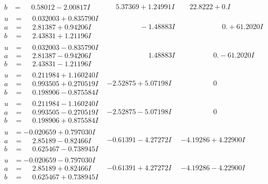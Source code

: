 \documentclass[1p]{elsarticle_modified}
\theoremstyle{definition}
\begin{document}
$$\begin{array}{c|c|c}
\begin{aligned}
b &= \phantom{-}0.58012 - 2.00817 I\end{aligned}
 & \phantom{-}5.37369 + 1.24991 I & \phantom{-}22.8222 + 0. I\phantom{ +0.000000I} \\ \hline\begin{aligned}
u &= \phantom{-}0.032003 + 0.835790 I \\
a &= \phantom{-}2.81387 + 0.94206 I \\
b &= \phantom{-}2.43831 + 1.21196 I\end{aligned}
 & \phantom{-0.000000 } -1.48883 I & \phantom{-0.000000 -}0. + 61.2020 I \\ \hline\begin{aligned}
u &= \phantom{-}0.032003 - 0.835790 I \\
a &= \phantom{-}2.81387 - 0.94206 I \\
b &= \phantom{-}2.43831 - 1.21196 I\end{aligned}
 & \phantom{-0.000000 -}1.48883 I & \phantom{-0.000000 } 0. - 61.2020 I \\ \hline\begin{aligned}
u &= \phantom{-}0.211984 + 1.160240 I \\
a &= \phantom{-}0.993505 + 0.270519 I \\
b &= \phantom{-}0.198906 - 0.875584 I\end{aligned}
 & -2.52875 + 5.07198 I & \phantom{-0.000000 } 0 \\ \hline\begin{aligned}
u &= \phantom{-}0.211984 - 1.160240 I \\
a &= \phantom{-}0.993505 - 0.270519 I \\
b &= \phantom{-}0.198906 + 0.875584 I\end{aligned}
 & -2.52875 - 5.07198 I & \phantom{-0.000000 } 0 \\ \hline\begin{aligned}
u &= -0.020659 + 0.797030 I \\
a &= \phantom{-}2.85189 - 0.82466 I \\
b &= \phantom{-}0.625467 - 0.738945 I\end{aligned}
 & -0.61391 - 4.27272 I & -4.19286 + 4.22900 I \\ \hline\begin{aligned}
u &= -0.020659 - 0.797030 I \\
a &= \phantom{-}2.85189 + 0.82466 I \\
b &= \phantom{-}0.625467 + 0.738945 I\end{aligned}
 & -0.61391 + 4.27272 I & -4.19286 - 4.22900 I \\ \hline\begin{aligned}

\end{aligned}
\end{array}$$
\end{document}

